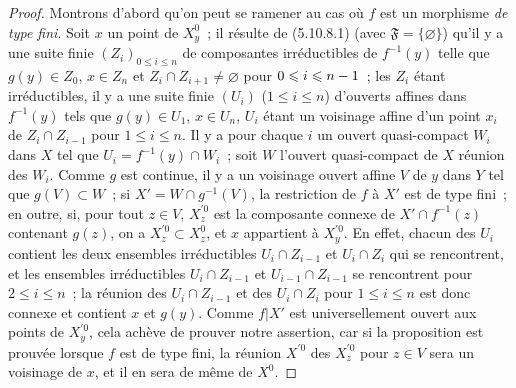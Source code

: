 \begin{proof}
Montrons d'abord qu'on peut se ramener au cas où $f$ est un morphisme \emph{de type fini}. Soit $x$ un point de $X_y^0$~; il résulte de (5.10.8.1) (avec $\mathfrak F=\{\varnothing\}$) qu'il y a une suite finie $(Z_i)_{0\leqslant i\leqslant n}$ de composantes irréductibles de $f^{-1}(y)$ telle que $g(y)\in Z_0$, $x\in Z_n$ et $Z_i\cap Z_{i+1}\ne\varnothing$ pour $0\leqslant i\leqslant n- 1$~; les $Z_i$ étant irréductibles, il y a une suite finie $(U_i)$ ($1\leqslant i\leqslant n$) d'ouverts affines dans $f^{-1}(y)$ tels que $g(y)\in U_1$, $x\in U_n$, $U_i$ étant un voisinage affine d'un point $x_i$ de $Z_i\cap Z_{i-1}$ pour $1\leqslant i\leqslant n$. Il y a pour chaque $i$ un ouvert quasi-compact $W_i$ dans $X$ tel que $U_i=f^{-1}(y)\cap W_i$~; soit $W$ l'ouvert quasi-compact de $X$ réunion des $W_i$. Comme $g$ est continue, il y a un voisinage ouvert affine $V$ de $y$ dans $Y$ tel que $g(V)\subset W$~; si $X'=W\cap g^{-1}(V)$, la restriction de $f$ à $X'$ est de type fini~; en outre, si, pour tout $z\in V$, $X_z^{\prime 0}$ est la composante connexe de $X'\cap f^{-1}(z)$ contenant $g(z)$, on a $X_z^{\prime 0}\subset X_z^0$, et $x$ appartient à $X_y^{\prime 0}$. En effet, chacun des $U_i$ contient les deux ensembles irréductibles $U_i\cap Z_{i-1}$ et $U_i\cap Z_i$ qui se rencontrent, et les ensembles irréductibles $U_i\cap Z_{i-1}$ et $U_{i-1}\cap Z_{i-1}$
se rencontrent pour $2\leqslant i\leqslant n$~; la réunion des $U_i\cap Z_{i-1}$ et des $U_i\cap Z_i$ pour $1\leqslant i\leqslant n$ est donc connexe et contient $x$ et $g(y)$. Comme $f|X'$ est universellement ouvert aux points de $X_y^{\prime 0}$, cela achève de prouver notre assertion, car si la proposition est prouvée lorsque $f$ est de type fini, la réunion $X^{\prime 0}$ des $X_z^{\prime 0}$ pour $z\in V$ sera un voisinage de $x$, et il en sera de même de $X^0$.


\end{proof}
